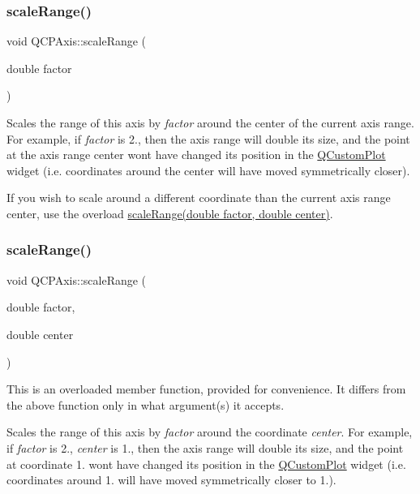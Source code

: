 \subsubsection{\texorpdfstring{scale\+Range()}{scaleRange()}\hspace{0.1cm}{\footnotesize\ttfamily [1/2]}}
{\footnotesize\ttfamily void Q\+C\+P\+Axis\+::scale\+Range (\begin{DoxyParamCaption}\item[{double}]{factor }\end{DoxyParamCaption})}

Scales the range of this axis by {\itshape factor} around the center of the current axis range. For example, if {\itshape factor} is 2., then the axis range will double its size, and the point at the axis range center won\textquotesingle{}t have changed its position in the \hyperlink{classQCustomPlot}{Q\+Custom\+Plot} widget (i.\+e. coordinates around the center will have moved symmetrically closer).

If you wish to scale around a different coordinate than the current axis range center, use the overload \hyperlink{classQCPAxis_a7072ff96fe690148f1bbcdb4f773ea1c}{scale\+Range(double factor, double center)}. \mbox{\label{classQCPAxis_a7072ff96fe690148f1bbcdb4f773ea1c}} 
\subsubsection{\texorpdfstring{scale\+Range()}{scaleRange()}\hspace{0.1cm}{\footnotesize\ttfamily [2/2]}}
{\footnotesize\ttfamily void Q\+C\+P\+Axis\+::scale\+Range (\begin{DoxyParamCaption}\item[{double}]{factor,  }\item[{double}]{center }\end{DoxyParamCaption})}

This is an overloaded member function, provided for convenience. It differs from the above function only in what argument(s) it accepts.

Scales the range of this axis by {\itshape factor} around the coordinate {\itshape center}. For example, if {\itshape factor} is 2., {\itshape center} is 1., then the axis range will double its size, and the point at coordinate 1. won\textquotesingle{}t have changed its position in the \hyperlink{classQCustomPlot}{Q\+Custom\+Plot} widget (i.\+e. coordinates around 1. will have moved symmetrically closer to 1.).

